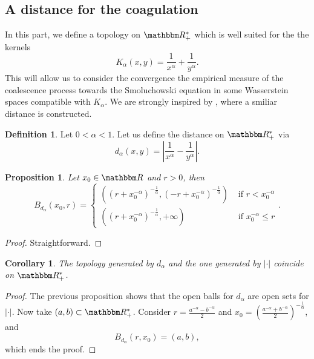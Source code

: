 \documentclass[a4paper,11pt, reqno]{amsart}
\newcommand{\1}{\mathbbm{1}}
\theoremstyle{plain}
\newtheorem{corollary}[theorem]{Corollary}
\newtheorem{proposition}[theorem]{Proposition}
\theoremstyle{definition}
\newtheorem{definition}[theorem]{Definition}
\begin{document}
\subsection{A distance for the coagulation}

In this part, we define a topology on $\RR_+^{\ast}$ which is well
suited for the the kernels
\begin{equation}
  K_{\alpha} (x, y) = \frac{1}{x^{\alpha}} + \frac{1}{y^{\alpha}} .
  \label{eq:def-Kalpha}
\end{equation}
This will allow us to consider the convergence the empirical measure of the
coalescence process towards the Smoluchowski equation in some Wasserstein
spaces compatible with $K_{\alpha}$. We are strongly inspired by
{\cite{fournierDistanceCoagulation2006}}, where a smiliar distance is
constructed.

\begin{definition}
  Let $0 < \alpha < 1$. Let us define the distance on $\RR_+^{\ast}$
  via
  \[ d_{\alpha} (x, y) = \left| \frac{1}{x^{\alpha}} - \frac{1}{y^{\alpha}}
     \right| . \]
\end{definition}

\begin{proposition}
  Let $x_0 \in \RR$ and $r > 0$, then
  \[ B_{d_{\alpha}} (x_0, r) = \left\{\begin{array}{ll}
       \left( (r + x_0^{- \alpha})^{- \frac{1}{\alpha}}, (- r + x_0^{-
       \alpha})^{- \frac{1}{\alpha}} \right) &  \text{ if } r < x_0^{- \alpha}\\
       \left( (r + x_0^{- \alpha})^{- \frac{1}{\alpha}}, + \infty \right) &
        \text{ if } x_0^{- \alpha} \le r
     \end{array}\right. . \]
\end{proposition}

\begin{proof}
  Straightforward.
\end{proof}

\begin{corollary}
  The topology generated by $d_{\alpha}$ and the one generated by $| \cdot
  |$ coincide on $\RR_+^{\ast}$.
\end{corollary}

\begin{proof}
  The previous proposition shows that the open balls for $d_{\alpha}$ are open
  sets for $| \cdot |$. Now take $(a, b) \subset \RR_+^{\ast}$.
  Consider $r = \frac{a^{- \alpha} - b^{- \alpha}}{2}$ and $x_0 = \left(
  \frac{a^{- \alpha} + b^{- \alpha}}{2} \right)^{- \frac{1}{\alpha}}$, and
  \[ B_{d_{\alpha}} (r, x_0) = (a, b), \]
  which ends the proof.
\end{proof}
\end{document}

